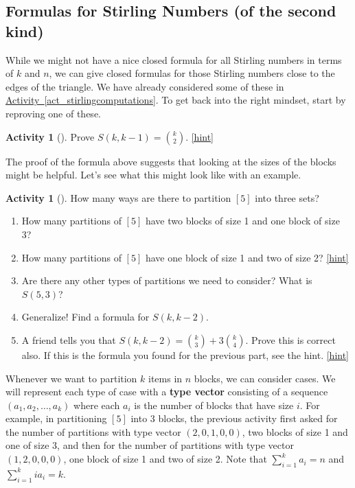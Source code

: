 \documentclass[10pt,]{book}
\newcommand{\terminology}[1]{\textbf{#1}}
\theoremstyle{plain}
\theoremstyle{definition}
\theoremstyle{definition}
\theoremstyle{definition}
\newtheorem{activity}[project]{Activity}
\numberwithin{equation}{chapter}
\begin{document}
\subsection[{Formulas for Stirling Numbers (of the second kind)}]{Formulas for Stirling Numbers (of the second kind)}\label{subsec-stirlingformulas}
\hypertarget{p-1396}{}%
While we might not have a nice closed formula for all Stirling numbers in terms of \(k\) and \(n\), we can give closed formulas for those Stirling numbers close to the edges of the triangle.  We have already considered some of these in \hyperref[act_stirlingcomputations]{Activity~\ref{act_stirlingcomputations}}.  To get back into the right mindset, start by reproving one of these.%
\begin{activity}[]\label{activity-266}
\hypertarget{p-1397}{}%
Prove \(S(k, k-1) = \binom{k}{2}\).%
\hfill{\tiny\hyperlink{a-273}{[hint]}\hypertarget{q-273}{}}\end{activity}
\hypertarget{p-1400}{}%
The proof of the formula above suggests that looking at the sizes of the blocks might be helpful.  Let's see what this might look like with an example.%
\begin{activity}[]\label{activity-267}
\hypertarget{p-1401}{}%
How many ways are there to partition \([5]\) into three sets?%
\begin{enumerate}[font=\bfseries,label=(\alph*),ref=\alph*]
\item\label{task-254} \hypertarget{p-1402}{}%
How many partitions of \([5]\) have two blocks of size 1 and one block of size 3?%
\item\label{task-255} \hypertarget{p-1403}{}%
How many partitions of \([5]\) have one block of size 1 and two of size 2?%
\hfill{\tiny\hyperlink{a-274.b}{[hint]}\hypertarget{q-274.b}{}}\item\label{task-256} \hypertarget{p-1405}{}%
Are there any other types of partitions we need to consider?  What is \(S(5,3)\)?%
\item\label{task-257} \hypertarget{p-1406}{}%
Generalize! Find a formula for \(S(k, k-2)\).%
\item\label{task-258} \hypertarget{p-1407}{}%
A friend tells you that \(S(k,k-2) = \binom{k}{3} + 3 \binom{k}{4}\).  Prove this is correct also.  If this is the formula you found for the previous part, see the hint.%
\hfill{\tiny\hyperlink{a-274.e}{[hint]}\hypertarget{q-274.e}{}}\end{enumerate}
\end{activity}
\hypertarget{p-1409}{}%
 Whenever we want to partition \(k\) items in \(n\) blocks, we can consider cases.  We will represent each type of case with a \terminology{type vector} consisting of a sequence \((a_1, a_2, \ldots, a_k)\) where each \(a_i\) is the number of blocks that have size \(i\).  For example, in partitioning \([5]\) into 3 blocks, the previous activity first asked for the number of partitions with type vector \((2,0,1,0,0)\), two blocks of size 1 and one of size 3, and then for the number of partitions with type vector \((1,2,0,0,0)\), one block of size 1 and two of size 2.  Note that \(\sum_{i=1}^k a_i = n\) and \(\sum_{i=1}^k ia_i = k\).%
\end{document}
